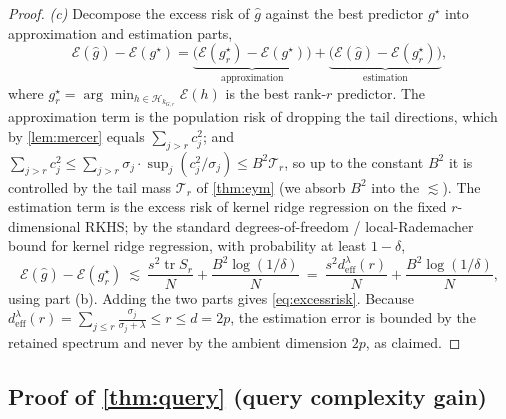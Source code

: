 \documentclass[aps,prxquantum,reprint,amsmath,amssymb,floatfix,nofootinbib,superscriptaddress,longbibliography]{revtex4-2}
\theoremstyle{remark}
\begin{document}
\begin{proof}
\emph{(c)} Decompose the excess risk of \(\widehat g\) against the best
predictor \(g^\star\) into approximation and estimation parts,
\[
    \mathcal E(\widehat g)-\mathcal E(g^\star)
    =\underbrace{\bigl(\mathcal E(g_r^\star)-\mathcal E(g^\star)\bigr)}
    _{\text{approximation}}
    +\underbrace{\bigl(\mathcal E(\widehat g)-\mathcal E(g_r^\star)\bigr)}
    _{\text{estimation}},
\]
where \(g_r^\star=\arg\min_{h\in\mathcal H_{k_{G,r}}}\mathcal E(h)\) is the best
rank-\(r\) predictor.  The approximation term is the population risk of dropping
the tail directions, which by \cref{lem:mercer} equals
\(\sum_{j>r}c_j^2\); and \(\sum_{j>r}c_j^2\le\sum_{j>r}\sigma_j\cdot
\sup_j(c_j^2/\sigma_j)\le B^2\mathcal T_r\), so up to the constant \(B^2\) it is
controlled by the tail mass \(\mathcal T_r\) of \cref{thm:eym} (we absorb \(B^2\)
into the \(\lesssim\)).  The estimation term is the excess risk of kernel ridge
regression on the fixed \(r\)-dimensional RKHS; by the standard degrees-of-freedom
/ local-Rademacher bound for kernel ridge regression, with probability at least
\(1-\delta\),
\[
    \mathcal E(\widehat g)-\mathcal E(g_r^\star)
    \ \lesssim\ \frac{s^2\operatorname{tr}S_r}{N}+\frac{B^2\log(1/\delta)}{N}
    \ =\ \frac{s^2 d_{\mathrm{eff}}^{\lambda}(r)}{N}+\frac{B^2\log(1/\delta)}{N},
\]
using part (b).  Adding the two parts gives \cref{eq:excessrisk}.  Because
\(d_{\mathrm{eff}}^{\lambda}(r)=\sum_{j\le r}\tfrac{\sigma_j}{\sigma_j+\lambda}
\le r\le d=2p\), the estimation error is bounded by the retained spectrum and
never by the ambient dimension \(2p\), as claimed.
\end{proof}

\subsection{Proof of \texorpdfstring{\cref{thm:query}}{Theorem 4} (query
complexity gain)}
\label{app:query}
\end{document}
